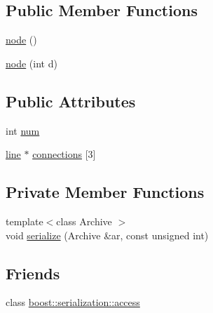 \subsection*{\-Public \-Member \-Functions}
\begin{DoxyCompactItemize}
\item 
\hyperlink{classnode_a82669b7358b50bd8d7888d7df4ff8dfa}{node} ()
\item 
\hyperlink{classnode_aa2c7b5711cccdc70afa02d02bd6d2586}{node} (int d)
\end{DoxyCompactItemize}
\subsection*{\-Public \-Attributes}
\begin{DoxyCompactItemize}
\item 
int \hyperlink{classnode_a7a5357a6527169c78888acf6fa2bac44}{num}
\item 
\hyperlink{classline}{line} $\ast$ \hyperlink{classnode_a876806ee1df6a4d08c2cc2c22aec69f2}{connections} \mbox{[}3\mbox{]}
\end{DoxyCompactItemize}
\subsection*{\-Private \-Member \-Functions}
\begin{DoxyCompactItemize}
\item 
{\footnotesize template$<$class Archive $>$ }\\void \hyperlink{classnode_a709432f116ea24ae21a2b5b6680ca13a}{serialize} (\-Archive \&ar, const unsigned int)
\end{DoxyCompactItemize}
\subsection*{\-Friends}
\begin{DoxyCompactItemize}
\item 
class \hyperlink{classnode_ac98d07dd8f7b70e16ccb9a01abf56b9c}{boost\-::serialization\-::access}
\end{DoxyCompactItemize}


